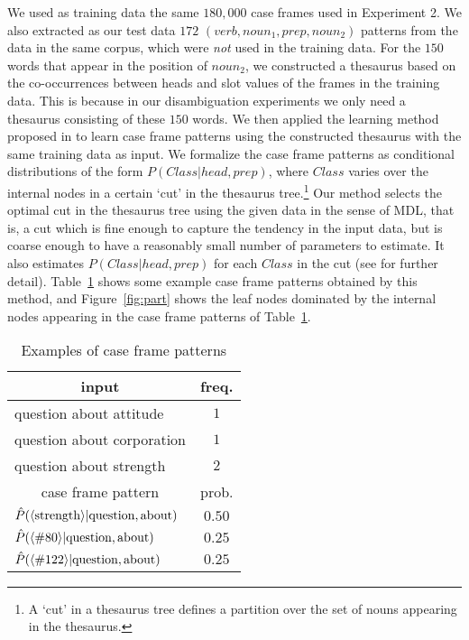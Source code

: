 We used as training data the same $180,000$ case frames used in
Experiment 2. We also extracted as our test data $172$
$(verb,noun_1,prep,noun_2)$ patterns from the data in the same corpus,
which were {\em not} used in the training data. For the $150$ words
that appear in the position of $noun_2$, we constructed a thesaurus
based on the co-occurrences between heads and slot values of the
frames in the training data. This is because in our disambiguation
experiments we only need a thesaurus consisting of these $150$ words. 
We then applied the learning method proposed in \cite{Li95} to learn
case frame patterns using the constructed thesaurus with the same
training data as input. We formalize the case frame patterns as
conditional distributions of the form $P(Class|head,prep)$, where
$Class$ varies over the internal nodes in a certain `cut' in the
thesaurus tree.\footnote{A `cut' in a thesaurus tree defines a
  partition over the set of nouns appearing in the thesaurus.} Our
method selects the optimal cut in the thesaurus tree using the given
data in the sense of MDL, that is, a cut which is fine enough to
capture the tendency in the input data, but is coarse enough to have a
reasonably small number of parameters to estimate. It also estimates
$P(Class|head,prep)$ for each $Class$ in the cut (see \cite{Li95} for
further detail).  Table~\ref{tb:pattern} shows some example case frame
patterns obtained by this method, and Figure~\ref{fig:part} shows the
leaf nodes dominated by the internal nodes appearing in the case frame
patterns of Table~\ref{tb:pattern}.
\begin{table}[htb]
\caption{Examples of case frame patterns}
\label{tb:pattern}
\begin{center}
\begin{tabular}{|l|c|} \hline
 \multicolumn{1}{|c|}{input} & {freq.} \\ \hline
question about attitude & $1$ \\
question about corporation & $1$ \\
question about strength & $2$ \\ \hline \hline
\multicolumn{1}{|c|}{case frame pattern} & {prob.} \\ \hline
$\hat{P}(\langle {\rm strength} \rangle|{\rm question},{\rm about})$ & $0.50$ \\
$\hat{P}(\langle \#80 \rangle|{\rm question},{\rm about})$ & $0.25$ \\
$\hat{P}(\langle \#122 \rangle|{\rm question},{\rm about})$ & $0.25$ \\ \hline
\end{tabular}
\end{center}
\end{table}

